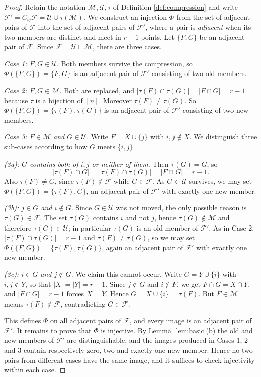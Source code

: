 \documentclass[10pt,a4paper]{amsart}
\newcommand{\F}{\mathcal{F}}
\newcommand{\M}{\mathcal{M}}
\newcommand{\Uu}{\mathcal{U}}
\begin{document}
\begin{proof}
Retain the notation $\M,\Uu,\tau$ of Definition \ref{def:compression} and write
$\F'=C_{ij}\F=\Uu\cup\tau(\M)$. We construct an injection $\Phi$ from the set of adjacent pairs of
$\F$ into the set of adjacent pairs of $\F'$, where a pair is \emph{adjacent} when its two members
are distinct and meet in $r-1$ points. Let $\{F,G\}$ be an adjacent pair of $\F$. Since
$\F=\Uu\sqcup\M$, there are three cases.

\smallskip
\noindent\textit{Case 1: $F,G\in\Uu$.} Both members survive the compression, so
$\Phi(\{F,G\})=\{F,G\}$ is an adjacent pair of $\F'$ consisting of two old members.

\smallskip
\noindent\textit{Case 2: $F,G\in\M$.} Both are replaced, and
$|\tau(F)\cap\tau(G)|=|F\cap G|=r-1$ because $\tau$ is a bijection of $[n]$. Moreover
$\tau(F)\ne\tau(G)$. So $\Phi(\{F,G\})=\{\tau(F),\tau(G)\}$ is an adjacent pair of $\F'$ consisting
of two new members.

\smallskip
\noindent\textit{Case 3: $F\in\M$ and $G\in\Uu$.} Write $F=X\cup\{j\}$ with $i,j\notin X$. We
distinguish three sub-cases according to how $G$ meets $\{i,j\}$.

\smallskip
\noindent\textit{(3a): $G$ contains both of $i,j$ or neither of them.} Then $\tau(G)=G$, so
\[
|\tau(F)\cap G|=|\tau(F)\cap\tau(G)|=|F\cap G|=r-1 .
\]
Also $\tau(F)\ne G$, since $\tau(F)\notin\F$ while $G\in\F$. As $G\in\Uu$ survives, we may set
$\Phi(\{F,G\})=\{\tau(F),G\}$, an adjacent pair of $\F'$ with exactly one new member.

\smallskip
\noindent\textit{(3b): $j\in G$ and $i\notin G$.} Since $G\in\Uu$ was not moved, the only possible
reason is $\tau(G)\in\F$. The set $\tau(G)$ contains $i$ and not $j$, hence $\tau(G)\notin\M$ and
therefore $\tau(G)\in\Uu$; in particular $\tau(G)$ is an old member of $\F'$. As in Case 2,
$|\tau(F)\cap\tau(G)|=r-1$ and $\tau(F)\ne\tau(G)$, so we may set
$\Phi(\{F,G\})=\{\tau(F),\tau(G)\}$, again an adjacent pair of $\F'$ with exactly one new member.

\smallskip
\noindent\textit{(3c): $i\in G$ and $j\notin G$.} We claim this cannot occur. Write $G=Y\cup\{i\}$
with $i,j\notin Y$, so that $|X|=|Y|=r-1$. Since $j\notin G$ and $i\notin F$, we get
$F\cap G=X\cap Y$, and $|F\cap G|=r-1$ forces $X=Y$. Hence $G=X\cup\{i\}=\tau(F)$. But $F\in\M$
means $\tau(F)\notin\F$, contradicting $G\in\F$.

\smallskip
This defines $\Phi$ on all adjacent pairs of $\F$, and every image is an adjacent pair of $\F'$. It
remains to prove that $\Phi$ is injective. By Lemma \ref{lem:basic}(b) the old and new members of
$\F'$ are distinguishable, and the images produced in Cases 1, 2 and 3 contain respectively zero,
two and exactly one new member. Hence no two pairs from different cases have the same image, and it
suffices to check injectivity within each case.


\end{proof}
\end{document}
